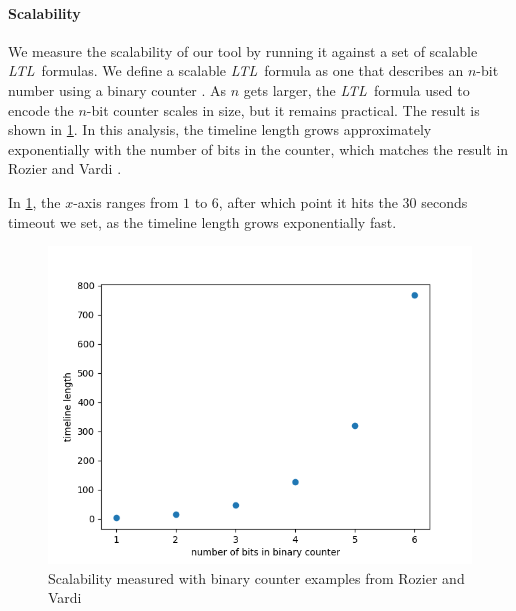 \documentclass[preprint,12pt]{elsarticle}
\theoremstyle{definition}
\theoremstyle{remark}
\newcommand{\ltl}{\textit{LTL}}
\begin{document}
\paragraph{Scalability}
We measure the scalability of our tool by running it against a set of scalable \ltl\ formulas. We define a scalable \ltl\ formula as one that describes an $n$-bit number using a binary counter \cite{RV10}. As $n$ gets larger, the \ltl\ formula used to encode the $n$-bit counter scales in size, but it remains practical. The result is shown in \cref{fig:scalability}. In this analysis, the timeline length grows approximately exponentially with the number of bits in the counter, which matches the result in Rozier and Vardi \cite{RV10}.

In \cref{fig:scalability}, the $x$-axis ranges from $1$ to $6$, after which point it hits the $30$ seconds timeout we set, as the timeline length grows exponentially fast.

\begin{figure}[h!]
    \centering
    \includegraphics[scale=0.6]{img/scale.png}
    \caption{Scalability measured with binary counter examples from Rozier and Vardi \cite{RV10}}
    \label{fig:scalability}
\end{figure}

\end{document}
